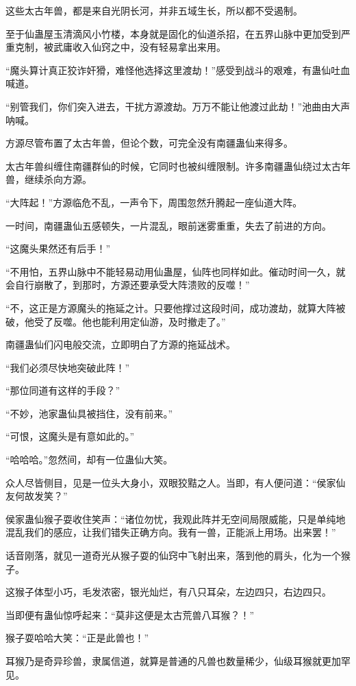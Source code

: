 \begin{this_body}
这些太古年兽，都是来自光阴长河，并非五域生长，所以都不受遏制。

至于仙蛊屋玉清滴风小竹楼，本身就是固化的仙道杀招，在五界山脉中更加受到严重克制，被武庸收入仙窍之中，没有轻易拿出来用。

“魔头算计真正狡诈奸猾，难怪他选择这里渡劫！”感受到战斗的艰难，有蛊仙吐血喊道。

“别管我们，你们突入进去，干扰方源渡劫。万万不能让他渡过此劫！”池曲由大声呐喊。

方源尽管布置了太古年兽，但论个数，可完全没有南疆蛊仙来得多。

太古年兽纠缠住南疆群仙的时候，它同时也被纠缠限制。许多南疆蛊仙绕过太古年兽，继续杀向方源。

“大阵起！”方源临危不乱，一声令下，周围忽然升腾起一座仙道大阵。

一时间，南疆蛊仙五感顿失，一片混乱，眼前迷雾重重，失去了前进的方向。

“这魔头果然还有后手！”

“不用怕，五界山脉中不能轻易动用仙蛊屋，仙阵也同样如此。催动时间一久，就会自行崩散了，到那时，方源还要承受大阵溃败的反噬！”

“不，这正是方源魔头的拖延之计。只要他撑过这段时间，成功渡劫，就算大阵被破，他受了反噬。他也能利用定仙游，及时撤走了。”

南疆蛊仙们闪电般交流，立即明白了方源的拖延战术。

“我们必须尽快地突破此阵！”

“那位同道有这样的手段？”

“不妙，池家蛊仙具被挡住，没有前来。”

“可恨，这魔头是有意如此的。”

“哈哈哈。”忽然间，却有一位蛊仙大笑。

众人尽皆侧目，见是一位头大身小，双眼狡黠之人。当即，有人便问道：“侯家仙友何故发笑？”

侯家蛊仙猴子耍收住笑声：“诸位勿忧，我观此阵并无空间局限威能，只是单纯地混乱我们的感应，让我们错失正确方向。我有一兽，正能派上用场。出来罢！”

话音刚落，就见一道奇光从猴子耍的仙窍中飞射出来，落到他的肩头，化为一个猴子。

这猴子体型小巧，毛发浓密，银光灿烂，有八只耳朵，左边四只，右边四只。

当即便有蛊仙惊呼起来：“莫非这便是太古荒兽八耳猴？！”

猴子耍哈哈大笑：“正是此兽也！”

耳猴乃是奇异珍兽，隶属信道，就算是普通的凡兽也数量稀少，仙级耳猴就更加罕见。


\end{this_body}
